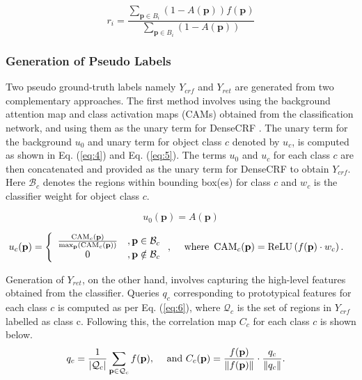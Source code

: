 \begin{equation} \label{eq:3}
r_{i}=\frac{\sum_{\mathbf{p} \in B_{i}}(1-A(\mathbf{p})) f(\mathbf{p})}{\sum_{\mathbf{p} \in B_{i}}(1-A(\mathbf{p}))}
\end{equation}

\subsubsection{Generation of Pseudo Labels}
\label{section3.1.2}
Two pseudo ground-truth labels namely $Y_{crf}$ and $Y_{ret}$ are generated from two complementary approaches. The first method involves using the background attention map and class activation maps (CAMs) \cite{zhou2016learning} obtained from the classification network, and using them as the unary term for DenseCRF \cite{huang2018weakly,kolesnikov2016seed,saleh2016built,zhang2020reliability}. The unary term for the background $u_0$ and  unary term for object class $c$ denoted by $u_c$, is computed as shown in Eq. (\ref{eq:4}) and Eq. (\ref{eq:5}). The terms $u_0$ and $u_c$ for each class $c$ are then concatenated and provided as the unary term for DenseCRF to obtain $Y_{crf}$. Here $\mathcal{B}_c$ denotes the regions within bounding box(es) for class $c$ and $w_c$ is the classifier weight for object class $c$.

\begin{equation} \label{eq:4}
u_{0}(\mathbf{p})=A(\mathbf{p})
\end{equation}

\begin{align}
\label{eq:5}
	u_{c}(\mathbf{p})=\left\{\begin{array}{cl}
    \frac{\operatorname{CAM}_{c}(\mathbf{p})}{\max _{\mathbf{p}}\left(\operatorname{CAM}_{c}(\mathbf{p})\right)} & , \mathbf{p} \in \mathcal{B}_{c} \\
    0 & , \mathbf{p} \notin \mathcal{B}_{c}
    \end{array}\right.,
	& \text{\hspace{0.5cm}where } \operatorname{CAM}_{c}(\mathbf{p})=\operatorname{ReLU}\left(f(\mathbf{p}) \cdot w_{c}\right).
\end{align}


Generation of $Y_{ret}$, on the other hand, involves capturing the high-level features obtained from the classifier. Queries $q_c$ corresponding to prototypical features for each class $c$ is computed as per Eq. (\ref{eq:6}), where $\mathcal{Q}_{c}$ is the set of regions in $Y_{crf}$ labelled as class c. Following this, the correlation map $C_c$ for each class $c$ is shown below.
\begin{align}
\label{eq:6}
    q_{c}=\frac{1}{\left|\mathcal{Q}_{c}\right|} \sum_{\mathbf{p} \in \mathcal{Q}_{c}} f(\mathbf{p}),
	& \text{\hspace{0.5cm}and  } C_{c}(\mathbf{p})=\frac{f(\mathbf{p})}{\|f(\mathbf{p})\|} \cdot \frac{q_{c}}{\left\|q_{c}\right\|}.
\end{align}


